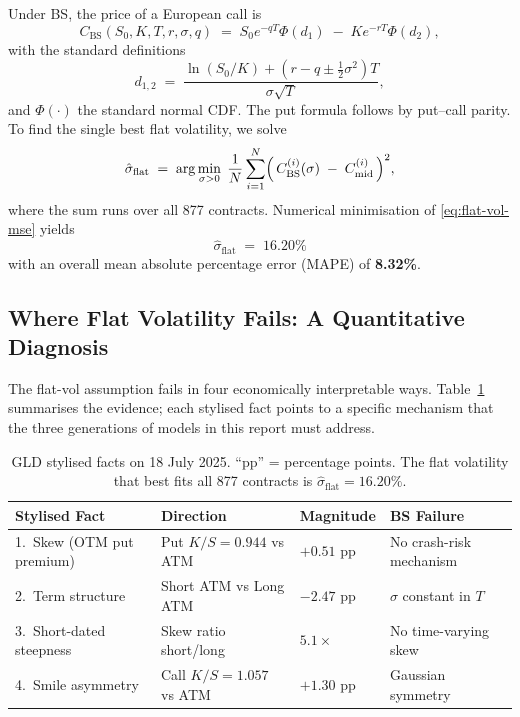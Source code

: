 \documentclass[12pt, a4paper]{article}
\begin{document}
Under BS, the price of a European call is
\begin{equation}
C_{\text{BS}}(S_0, K, T, r, \sigma, q)
\;=\; S_0 e^{-qT}\Phi(d_1) \;-\; K e^{-rT}\Phi(d_2),
\end{equation}
with the standard definitions
\begin{equation}
d_{1,2} \;=\; \frac{\ln(S_0/K) + (r - q \pm \tfrac{1}{2}\sigma^2)T}{\sigma\sqrt{T}},
\end{equation}
and $\Phi(\cdot)$ the standard normal CDF. The put formula follows by put--call parity. To find the single best flat volatility, we solve
\begin{equation}
\hat\sigma_{\text{flat}}
\;=\; \arg\min_{\sigma > 0}
\;\frac{1}{N}\sum_{i=1}^{N}
\Bigl(\, C_{\text{BS}}^{(i)}(\sigma) \;-\; C_{\text{mid}}^{(i)} \,\Bigr)^2,
\label{eq:flat-vol-mse}
\end{equation}
where the sum runs over all 877 contracts. Numerical minimisation of \eqref{eq:flat-vol-mse} yields
\begin{equation}
\boxed{\;\hat\sigma_{\text{flat}} \;=\; 16.20\%\;}
\end{equation}
with an overall mean absolute percentage error (MAPE) of \textbf{8.32\%}.

\subsection{Where Flat Volatility Fails: A Quantitative Diagnosis}
\label{subsec:bs-failure}

The flat-vol assumption fails in four economically interpretable ways. Table~\ref{tab:stylized-facts} summarises the evidence; each stylised fact points to a specific mechanism that the three generations of models in this report must address.

\begin{table}[H]
\centering
\small
\begin{tabular}{@{}llll@{}}
\toprule
\textbf{Stylised Fact} & \textbf{Direction} & \textbf{Magnitude} & \textbf{BS Failure} \\
\midrule
1.\ Skew (OTM put premium) & Put $K/S=0.944$ vs ATM & $+0.51$ pp & No crash-risk mechanism \\
2.\ Term structure & Short ATM vs Long ATM & $-2.47$ pp & $\sigma$ constant in $T$ \\
3.\ Short-dated steepness & Skew ratio short/long & $5.1\times$ & No time-varying skew \\
4.\ Smile asymmetry & Call $K/S=1.057$ vs ATM & $+1.30$ pp & Gaussian symmetry \\
\bottomrule
\end{tabular}
\caption{GLD stylised facts on 18 July 2025. ``pp'' = percentage points. The flat volatility that best fits all 877 contracts is $\hat\sigma_{\text{flat}} = 16.20\%$.}
\label{tab:stylized-facts}
\end{table}
\end{document}
